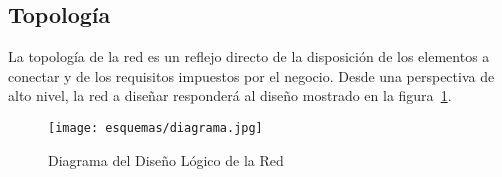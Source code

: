 \documentclass[a4paper,onecolumn,11pt]{article}
\begin{document}

\subsection{Topología}

La topología de la red es un reflejo directo de la disposición de los elementos
a conectar y de los requisitos impuestos por el negocio. Desde una
perspectiva de alto nivel, la red a diseñar responderá al diseño mostrado en
la figura~\ref{fig:diagrama}.

\begin{figure}[thbp]
\centering
\texttt{[image: esquemas/diagrama.jpg]}
\caption{Diagrama del Diseño Lógico de la Red}
\label{fig:diagrama}
\end{figure}
\end{document}
